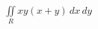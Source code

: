 \documentclass[preview]{standalone}
\begin{document}
\begin{align*}
\iint\limits_{R} xy (x+y) \, dx\,dy
\end{align*}
\end{document}
